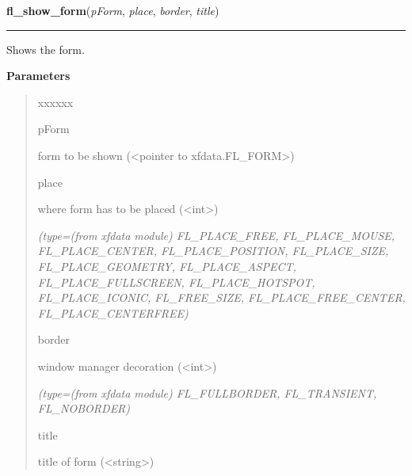     \label{xformslib:library:fl_show_form}

    \vspace{0.5ex}

\hspace{.8\funcindent}\begin{boxedminipage}{\funcwidth}

    \raggedright \textbf{fl\_show\_form}(\textit{pForm}, \textit{place}, \textit{border}, \textit{title})

    \vspace{-1.5ex}

    \rule{\textwidth}{0.5\fboxrule}
\setlength{\parskip}{2ex}
    Shows the form.

\setlength{\parskip}{1ex}
      \textbf{Parameters}
      \vspace{-1ex}

      \begin{quote}
        \begin{Ventry}{xxxxxx}

          \item[pForm]

          form to be shown ({\textless}pointer to 
          xfdata.FL\_FORM{\textgreater})

          \item[place]

          where form has to be placed ({\textless}int{\textgreater})

            {\it (type=(from xfdata module) FL\_PLACE\_FREE, FL\_PLACE\_MOUSE, FL\_PLACE\_CENTER, 
FL\_PLACE\_POSITION, FL\_PLACE\_SIZE, FL\_PLACE\_GEOMETRY, 
FL\_PLACE\_ASPECT, FL\_PLACE\_FULLSCREEN, FL\_PLACE\_HOTSPOT, 
FL\_PLACE\_ICONIC, FL\_FREE\_SIZE, FL\_PLACE\_FREE\_CENTER, 
FL\_PLACE\_CENTERFREE)}

          \item[border]

          window manager decoration ({\textless}int{\textgreater})

            {\it (type=(from xfdata module) FL\_FULLBORDER, FL\_TRANSIENT, FL\_NOBORDER)}

          \item[title]

          title of form ({\textless}string{\textgreater})

        \end{Ventry}


\end{quote}
\end{boxedminipage}
